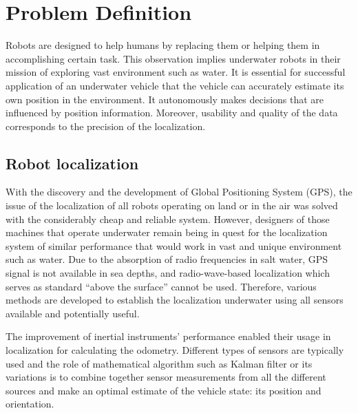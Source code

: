 \chapter{Problem Definition} \label{chap:problem-def}
Robots are designed to help humans by replacing them or helping them in accomplishing certain task. This observation implies underwater robots in their mission of exploring vast environment such as water. It is essential for successful application of an underwater vehicle that the vehicle can accurately estimate its own position in the environment. It autonomously makes decisions that are influenced by position information. Moreover, usability and quality of the data corresponds to the precision of the localization.
\section{Robot localization}
With the discovery and the development of Global Positioning System (GPS), the issue of the localization of all robots operating on land or in the air was solved with the considerably cheap and reliable system. However, designers of those machines that operate underwater remain being in quest for the localization system of similar performance that would work in vast and unique environment such as water. Due to the absorption of radio frequencies in salt water, GPS signal is not available in sea depths, and radio-wave-based localization which serves as standard ``above the surface'' cannot be used. Therefore, various methods are developed to establish the localization underwater using all sensors available and potentially useful. 

The improvement of inertial instruments' performance enabled their usage in localization for calculating the odometry. Different types of sensors are typically used and the role of mathematical algorithm such as Kalman filter or its variations is to combine together sensor measurements from all the different sources and make an optimal estimate of the vehicle state: its position and orientation. 

